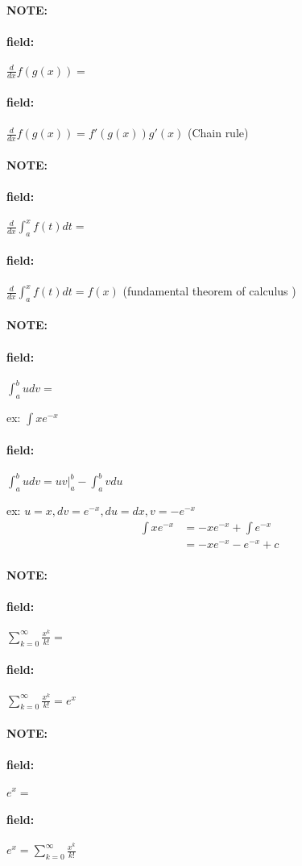 \documentclass[12pt]{article}
\newenvironment{note}{\paragraph{NOTE:}}{}
\newenvironment{field}{\paragraph{field:}}{}
\begin{document}
\begin{note}
  \begin{field}
    $\frac{d}{dx}f(g(x)) = $
  \end{field}
  \begin{field}
    $\frac{d}{dx}f(g(x)) = f'(g(x))g'(x)$ (Chain rule)
  \end{field}
\end{note}

\begin{note}
  \begin{field}
    $\frac{d}{dx} \int_{a}^x f(t)dt = $
  \end{field}
  \begin{field}
    $\frac{d}{dx} \int_{a}^x f(t)dt = f(x)$ (fundamental theorem of calculus )
  \end{field}
\end{note}


\begin{note}
  \begin{field}
    $\int_a^b u dv = $

    ex: $\int x e^{-x}$
  \end{field}
  \begin{field}
    $\int_a^b u dv = uv|_a^b - \int_a^b v du $

    ex: $u = x, dv = e^{-x}, du = dx, v = -e^{-x}$
    \begin{align*}
      \int x e^{-x} &= -x e^{-x} + \int e^{-x} \\
      &= -x e^{-x}  -e^{-x} + c
    \end{align*}
  \end{field}
\end{note}

\begin{note}
  \begin{field}
    $\sum_{k=0}^\infty \frac{x^k}{k!} = $
  \end{field}
  \begin{field}
    $\sum_{k=0}^\infty \frac{x^k}{k!} = e^x$
  \end{field}
\end{note}


\begin{note}
  \begin{field}
    $e^x = $
  \end{field}
  \begin{field}
    $e^x = \sum_{k=0}^\infty \frac{x^k}{k!}$
  \end{field}
\end{note}
\end{document}

